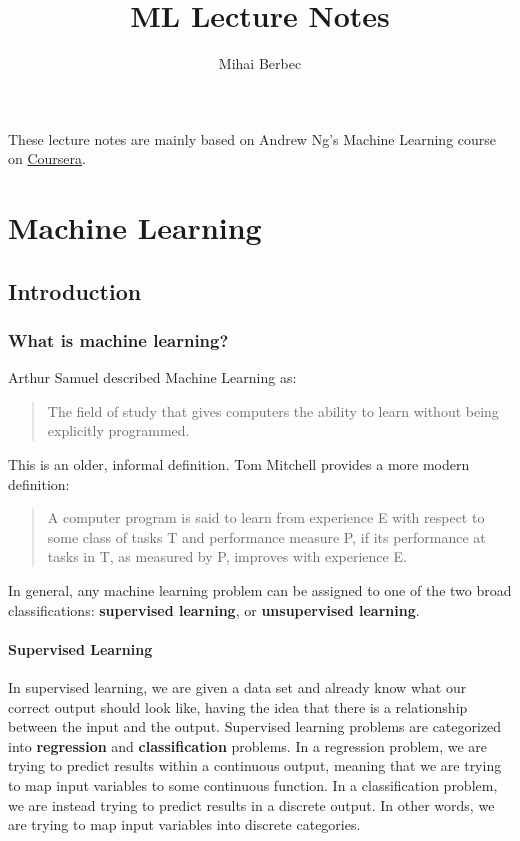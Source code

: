 \documentclass[a4paper,11pt]{report}
\begin{document}
\title{ML Lecture Notes}
\author{Mihai Berbec}
\maketitle

These lecture notes are mainly based on Andrew Ng's Machine Learning course on \href{https://www.coursera.org/learn/machine-learning/}{Coursera}.

\tableofcontents

\part{Machine Learning}

\chapter{Introduction}

\section{What is machine learning?}

Arthur Samuel described Machine Learning as:
\begin{quote}
The field of study that gives computers the ability to learn without being explicitly programmed.
\end{quote}

This is an older, informal definition. Tom Mitchell provides a more modern definition:
\begin{quote}
A computer program is said to learn from experience E with respect to some class of tasks T and performance measure P, if its performance at tasks in T, as measured by P, improves with experience E.
\end{quote}

In general, any machine learning problem can be assigned to one of the two broad classifications: \textbf{supervised learning}, or \textbf{unsupervised learning}.

\subsection*{Supervised Learning}

In supervised learning, we are given a data set and already know what our correct output should look like, having the idea that there is a relationship between the input and the output.
Supervised learning problems are categorized into \textbf{regression} and \textbf{classification} problems. In a regression problem, we are trying to predict results within a continuous output, meaning that we are trying to map input variables to some continuous function. In a classification problem, we are instead trying to predict results in a discrete output. In other words, we are trying to map input variables into discrete categories.
\end{document}
